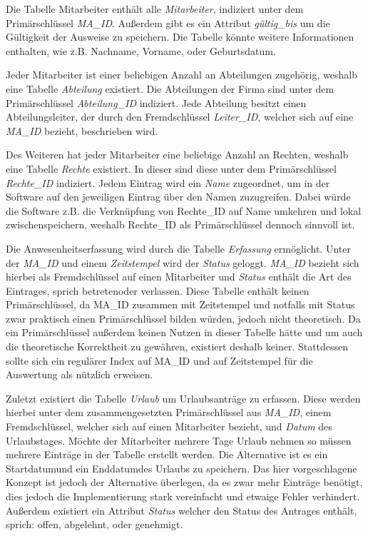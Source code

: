 Die Tabelle Mitarbeiter enthält alle \textit{Mitarbeiter}, indiziert unter dem Primär\-schlüssel \textit{MA\_ID}. Außerdem gibt es ein Attribut \textit{gültig\_bis} um die Gültigkeit der Ausweise zu speichern. Die Tabelle könnte weitere Informationen enthalten, wie z.B. \glqq Nachname\grqq, \glqq Vorname\grqq, oder \glqq Geburtsdatum\grqq. \newline

Jeder Mitarbeiter ist einer beliebigen Anzahl an Abteilungen zugehörig, weshalb eine Tabelle \textit{Abteilung} existiert. Die Abteilungen der Firma sind unter dem Primärschlüssel \textit{Abteilung\_ID} indiziert. Jede Abteilung besitzt einen Abteilungsleiter, der durch den Fremdschlüssel \textit{Leiter\_ID}, welcher sich auf eine \textit{MA\_ID} bezieht, beschrieben wird. \newline

Des Weiteren hat jeder Mitarbeiter eine beliebige Anzahl an Rechten, weshalb eine Tabelle \textit{Rechte} existiert. In dieser sind diese unter dem Primärschlüssel \textit{Rechte\_ID} indiziert. Jedem Eintrag wird ein \textit{Name} zugeordnet, um in der Software auf den jeweiligen Eintrag über den Namen zuzugreifen. Dabei würde die Software z.B. die Verknüpfung von Rechte\_ID auf Name umkehren und lokal zwischenspeichern, weshalb Rechte\_ID als Primärschlüssel dennoch sinnvoll ist. \newline

Die Anwesenheitserfassung wird durch die Tabelle \textit{Erfassung} ermöglicht. Unter der \textit{MA\_ID} und einem \textit{Zeitstempel} wird der \textit{Status} geloggt. \textit{MA\_ID} bezieht sich hierbei als Fremdschlüssel auf einen Mitarbeiter und \textit{Status} enthält die Art des Eintrages, sprich \glqq betreten\grqq oder \glqq verlassen\grqq . Diese Tabelle enthält keinen Primärschlüssel, da MA\_ID zusammen mit Zeitstempel und notfalls mit Status zwar praktisch einen Primärschlüssel bilden würden, jedoch nicht theoretisch. Da ein Primärschlüssel außerdem keinen Nutzen in dieser Tabelle hätte und um auch die theoretische Korrektheit zu gewähren, existiert deshalb keiner. Stattdessen sollte sich ein regulärer Index auf MA\_ID und auf Zeitstempel für die Auswertung als nützlich erweisen. \newline

Zuletzt existiert die Tabelle \textit{Urlaub} um Urlaubsanträge zu erfassen. Diese werden hierbei unter dem zusammengesetzten Primärschlüssel aus \textit{MA\_ID}, einem Fremdschlüssel, welcher sich auf einen Mitarbeiter bezieht, und \textit{Datum} des Urlaubstages. Möchte der Mitarbeiter mehrere Tage Urlaub nehmen so müssen mehrere Einträge in der Tabelle erstellt werden. Die Alternative ist es ein \glqq Startdatum\grqq und ein \glqq Enddatum\grqq des Urlaubs zu speichern. Das hier vorgeschlagene Konzept ist jedoch der Alternative überlegen, da es zwar mehr Einträge benötigt, dies jedoch die Implementierung stark vereinfacht und etwaige Fehler verhindert. Außerdem existiert ein Attribut \textit{Status} welcher den Status des Antrages enthält, sprich: \glqq offen\grqq, \glqq abgelehnt\grqq, oder \glqq genehmigt\grqq.

